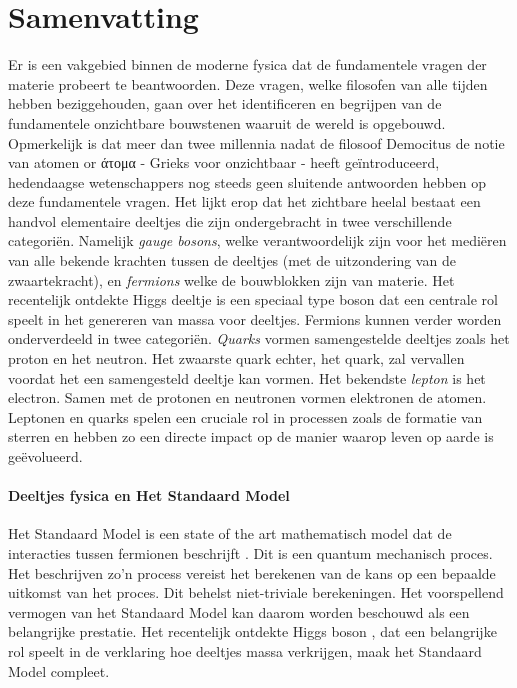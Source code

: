 \chapter*{Samenvatting}

Er is een vakgebied binnen de moderne fysica dat de fundamentele vragen der materie probeert te beantwoorden.
Deze vragen, welke filosofen van alle tijden hebben beziggehouden, gaan over het identificeren en begrijpen
van de fundamentele onzichtbare bouwstenen waaruit de wereld is opgebouwd. Opmerkelijk is dat meer dan twee
millennia nadat de filosoof Democitus de notie van atomen or \textgreek{άτομα} - Grieks voor onzichtbaar -  heeft ge\"introduceerd,
hedendaagse wetenschappers nog steeds geen sluitende antwoorden hebben op deze fundamentele vragen. Het lijkt erop dat het
zichtbare heelal bestaat een handvol elementaire deeltjes die zijn ondergebracht in twee verschillende categori\"en. Namelijk
{\it gauge bosons}, welke verantwoordelijk zijn voor het medi\"eren van alle bekende krachten tussen de deeltjes
(met de uitzondering van de zwaartekracht), en {\it fermions} welke de bouwblokken zijn van materie. Het recentelijk ontdekte
Higgs deeltje \cite{higgs-cms,higgs-atlas} is een speciaal type boson dat een centrale rol speelt in het genereren van massa
voor deeltjes. Fermions kunnen verder worden onderverdeeld in twee categori\"en. {\it Quarks} vormen samengestelde deeltjes
zoals het proton en het neutron. Het zwaarste quark echter, het \tquark quark, zal vervallen voordat het een samengesteld
deeltje kan vormen. Het bekendste {\it lepton} is het electron. Samen met de protonen en neutronen vormen elektronen de atomen.
Leptonen en quarks spelen een cruciale rol in processen zoals de formatie van sterren en hebben zo een directe impact op de
manier waarop leven op aarde is ge\"evolueerd.

\subsubsection{Deeltjes fysica en Het Standaard Model}
Het Standaard Model is een state of the art mathematisch model dat de interacties tussen fermionen
beschrijft \cite{sm-glashow,sm-weinberg,sm-salam}. Dit is een quantum mechanisch proces.
Het beschrijven zo'n process vereist het berekenen van de kans op een bepaalde uitkomst van het proces.
Dit behelst niet-triviale berekeningen. Het voorspellend vermogen van het Standaard Model kan daarom
worden beschouwd als een belangrijke prestatie. Het recentelijk ontdekte Higgs boson \cite{higgs-cms,higgs-atlas},
dat een belangrijke rol speelt in de verklaring hoe deeltjes massa verkrijgen, maak het Standaard Model compleet.

